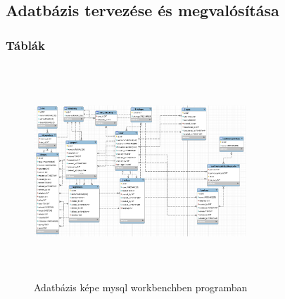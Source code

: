 \documentclass[conference]{IEEEtran}
\begin{document}
\subsection{\textbf{Adatbázis tervezése és megvalósítása}}


\subsubsection{\textbf{Táblák}}
\begin{figure}[htbp]
	\centerline {\includegraphics[width=8cm,height=8cm,keepaspectratio]{adatbazis.png}}
	\caption{Adatbázis képe mysql workbenchben programban}
	\label{fig1}
\end{figure}
\end{document}
